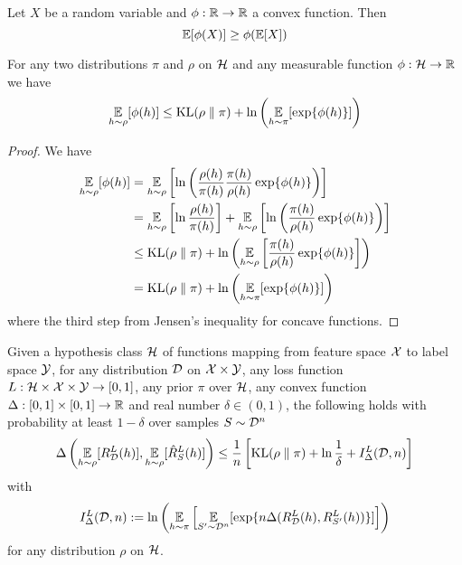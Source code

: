 \begin{lemma}
  Let $X$ be a random variable and $\phi : \mathbb{R} \to \mathbb{R}$ a convex function. Then
  \begin{equation}
    \operatorname*{\mathbb{E}}[\phi(X)] \geq \phi(\operatorname*{\mathbb{E}}[X])
  \end{equation}
\end{lemma}

\begin{lemma}
  For any two distributions $\pi$ and $\rho$ on $\mathcal{H}$ and any measurable
  function $\phi : \mathcal{H} \to \mathbb{R}$ we have
  \begin{equation}
    \operatorname*{\mathbb{E}}_{h \sim \rho}[\phi(h)] \leq \text{KL}(\rho \parallel \pi) + \ln\left(\operatorname*{\mathbb{E}}_{h \sim
    \pi}[\exp\{\phi(h)\}]\right)
  \end{equation}
\end{lemma}

\begin{proof}
  We have
  \begin{equation}
    \begin{split}
      \operatorname*{\mathbb{E}}_{h \sim \rho}[\phi(h)]
      &= \operatorname*{\mathbb{E}}_{h \sim \rho}\left[\ln\left(\frac{\rho(h)}{\pi(h)}
      \frac{\pi(h)}{\rho(h)} \exp\{\phi(h)\}\right)\right] \\
      &= \operatorname*{\mathbb{E}}_{h \sim \rho}\left[\ln\frac{\rho(h)}{\pi(h)}\right] + \operatorname*{\mathbb{E}}_{h \sim
      \rho}\left[\ln\left(\frac{\pi(h)}{\rho(h)} \exp\{\phi(h)\}\right)\right]
      \\
      &\leq \text{KL}(\rho \parallel \pi) + \ln\left(\operatorname*{\mathbb{E}}_{h \sim
      \rho}\left[\frac{\pi(h)}{\rho(h)} \exp\{\phi(h)\}\right]\right) \\
      &= \text{KL}(\rho \parallel \pi) + \ln\left(\operatorname*{\mathbb{E}}_{h \sim \pi}[\exp\{\phi(h)\}]\right)
    \end{split}
  \end{equation}
  where the third step from Jensen's inequality for concave functions.
\end{proof}

\begin{theorem}
  \label{thm:pac-bayes}
  Given a hypothesis class $\mathcal{H}$ of functions mapping from feature space $\mathcal{X}$
  to label space $\mathcal{Y}$, for any distribution $\mathcal{D}$ on $\mathcal{X} \times \mathcal{Y}$, any loss
  function $L : \mathcal{H} \times \mathcal{X} \times \mathcal{Y} \to [0, 1]$, any prior $\pi$ over
  $\mathcal{H}$, any convex function $\Delta : [0, 1] \times [0, 1] \to \mathbb{R}$ and real
  number $\delta \in (0, 1)$, the following holds with probability at least $1 -
  \delta$ over samples $S \sim \mathcal{D}^n$
  \begin{equation}
    \label{eq:pac-bayes-bound}
    \Delta\left(\operatorname*{\mathbb{E}}_{h \sim \rho}[R_{\mathcal{D}}^L(h)], \operatorname*{\mathbb{E}}_{h \sim
    \rho}[\hat{R}_S^L(h)]\right) \leq \frac{1}{n} \left[\text{KL}(\rho \parallel \pi) +
    \ln \frac{1}{\delta} + I_\Delta^L(\mathcal{D}, n)\right]
  \end{equation}
  with
  \begin{equation}
    I_\Delta^L(\mathcal{D}, n) := \ln\left(\operatorname*{\mathbb{E}}_{h \sim \pi}\left[\operatorname*{\mathbb{E}}_{S' \sim
    \mathcal{D}^n}[\exp\{n \Delta(R_{\mathcal{D}}^L(h), R_{S'}^L(h))\}]\right]\right)
  \end{equation}
  for any distribution $\rho$ on $\mathcal{H}$.
\end{theorem}

